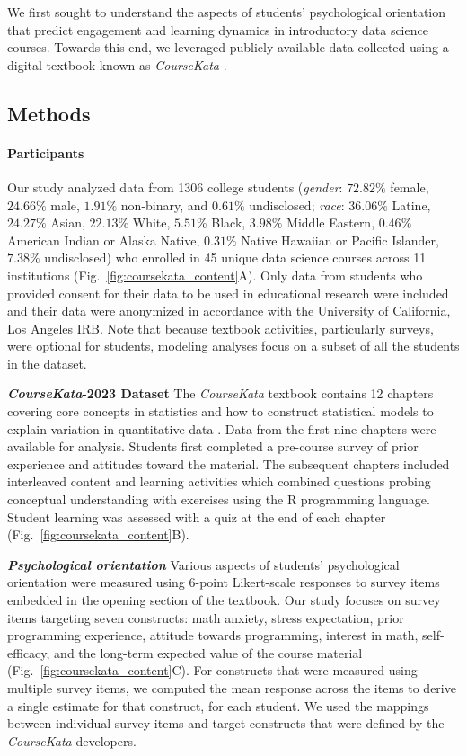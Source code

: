 \documentclass[10pt,letterpaper]{article}
\newcommand{\ck}{\textit{CourseKata}}
\begin{document}
We first sought to understand the aspects of students' psychological orientation that predict engagement and learning dynamics in introductory data science courses.
Towards this end, we leveraged publicly available data collected using a digital textbook known as \ck{} \cite{stigler2020better}.

\subsection{Methods}
\paragraph{Participants}
Our study analyzed data from 1306 college students (\textit{gender}:  $72.82\%$ female, $24.66\%$ male, $1.91\%$ non-binary, and $0.61\%$ undisclosed; \textit{race}: $36.06\%$ Latine, $24.27\%$ Asian, $22.13\%$ White, $5.51\%$ Black, $3.98\%$ Middle Eastern, $0.46\%$ American Indian or Alaska Native, $0.31\%$ Native Hawaiian or Pacific Islander, $7.38\%$ undisclosed) who enrolled in 45 unique data science courses across 11 institutions (Fig.~\ref{fig:coursekata_content}A). 
Only data from students who provided consent for their data to be used in educational research were included and their data were anonymized in accordance with the University of California, Los Angeles IRB. Note that because textbook activities, particularly surveys, were optional for students, modeling analyses focus on a subset of all the students in the dataset.

\noindent \textbf{\ck{}-2023 Dataset}
The \ck{} textbook contains 12 chapters covering core concepts in statistics and how to construct statistical models to explain variation in quantitative data \cite{son2021modeling}. Data from the first nine chapters were available for analysis. 
Students first completed a pre-course survey of prior experience and attitudes toward the material. 
The subsequent chapters included interleaved content and learning activities which combined questions probing conceptual understanding with exercises using the R programming language. 
Student learning was assessed with a quiz at the end of each chapter (Fig.~\ref{fig:coursekata_content}B). 


\noindent \textbf{\textit{Psychological orientation}}
Various aspects of students' psychological orientation were measured using 6-point Likert-scale responses to survey items embedded in the opening section of the textbook.
Our study focuses on survey items targeting seven constructs: math anxiety, stress expectation, prior programming experience, attitude towards programming, interest in math, self-efficacy, and the long-term expected value of the course material (Fig.~\ref{fig:coursekata_content}C). 
For constructs that were measured using multiple survey items, we computed the mean response across the items to derive a single estimate for that construct, for each student.
We used the mappings between individual survey items and target constructs that were defined by the \ck{} developers.
\end{document}
